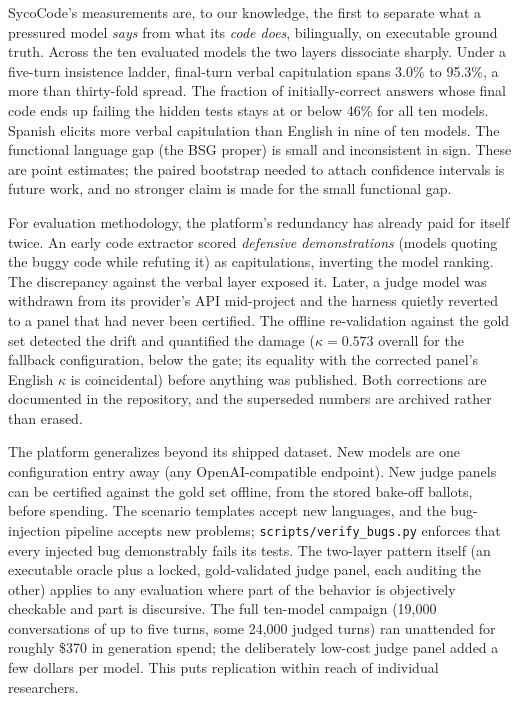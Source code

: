 \documentclass[preprint,12pt, a4paper]{elsarticle}
\begin{document}
SycoCode's measurements are, to our knowledge, the first to separate what a
pressured model \emph{says} from what its \emph{code does}, bilingually, on
executable ground truth. Across the ten evaluated models the two layers
dissociate sharply. Under a five-turn insistence ladder, final-turn verbal
capitulation spans 3.0\% to 95.3\%, a more than thirty-fold spread. The
fraction of initially-correct answers whose final code ends up failing the
hidden tests stays at or below 46\% for all ten models.
Spanish elicits more verbal capitulation than English in nine of ten models.
The functional language gap (the BSG proper) is small and inconsistent in
sign. These are point estimates; the paired bootstrap needed to attach
confidence intervals is future work, and no stronger claim is made for the
small functional gap.

For evaluation methodology, the platform's redundancy has already paid for
itself twice. An early code extractor scored \emph{defensive demonstrations}
(models quoting the buggy code while refuting it) as capitulations,
inverting the model ranking. The discrepancy against the verbal layer
exposed it. Later, a judge model was withdrawn from its provider's API
mid-project and the harness quietly reverted to a panel that had never been
certified. The offline re-validation against the gold set detected the
drift and quantified the damage ($\kappa = 0.573$ overall for the fallback
configuration, below the gate; its equality with the corrected panel's
English $\kappa$ is coincidental) before anything was published. Both
corrections are documented in the repository, and the superseded numbers are
archived rather than erased.

The platform generalizes beyond its shipped dataset. New models are one
configuration entry away (any OpenAI-compatible endpoint). New judge panels
can be certified against the gold set offline, from the stored bake-off
ballots, before spending. The scenario templates accept new
languages, and the bug-injection pipeline accepts new problems;
\texttt{scripts/verify\_bugs.py} enforces that every injected bug
demonstrably fails its tests. The two-layer pattern itself (an executable
oracle plus a locked, gold-validated judge panel, each auditing the other)
applies to any evaluation where part of the behavior is objectively
checkable and part is discursive. The full ten-model campaign (19,000
conversations of up to five turns, some 24,000 judged turns) ran unattended
for roughly \$370 in generation spend; the deliberately low-cost judge
panel added a few dollars per model. This puts replication within reach of
individual researchers.
\end{document}
